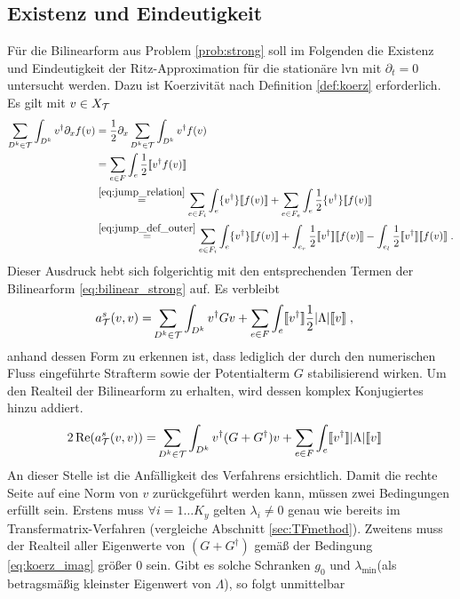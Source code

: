 \subsection{Existenz und Eindeutigkeit}
Für die Bilinearform aus Problem \ref{prob:strong} soll im Folgenden die Existenz und Eindeutigkeit der Ritz-Approximation für die stationäre \ac{lvn} mit $\partial_t=0$ untersucht werden. Dazu ist Koerzivität nach Definition \ref{def:koerz} erforderlich. Es gilt mit $v\in X_{\mathcal{T}}$
\begin{align*}
  \sum_{D^k\in\mathcal{T}}\int_{D^k} v^{\dagger} \partial_x f(v) &=
  \frac{1}{2}\partial_x \sum_{D^k\in\mathcal{T}}\int_{D^k} v^{\dagger} f(v) \\
  &= \sum_{e\in F}\int_e \frac{1}{2}\llbracket v^{\dagger} f(v) \rrbracket \\
  &\stackrel{\eqref{eq:jump_relation}}{=}  \sum_{e\in F_i}\int_e \{ v^{\dagger} \} \llbracket f(v) \rrbracket + \sum_{e\in F_e}\int_{e} \frac{1}{2}\{ v^{\dagger} \} \llbracket f(v) \rrbracket \\
  &\stackrel{\eqref{eq:jump_def_outer}}{=} \sum_{e\in F_i}\int_e \{ v^{\dagger} \} \llbracket f(v) \rrbracket + \int_{e_r}\frac{1}{2} \llbracket v^{\dagger} \rrbracket\llbracket f(v) \rrbracket - \int_{e_l}\frac{1}{2} \llbracket v^{\dagger} \rrbracket\llbracket f(v) \rrbracket \; .
\end{align*}
Dieser Ausdruck hebt sich folgerichtig mit den entsprechenden Termen der Bilinearform \eqref{eq:bilinear_strong} auf. Es verbleibt
\begin{equation*}
  \begin{aligned}
    a_{\mathcal{T}}^s(v, v) = &\sum_{D^k\in\mathcal{T}}\int_{D^k} v^{\dagger} G v
    + \sum_{e\in F}\int_e  \llbracket v^{\dagger} \rrbracket \frac{1}{2}|\Lambda| \llbracket v \rrbracket \; ,
  \end{aligned}
\end{equation*}
anhand dessen Form zu erkennen ist, dass lediglich der durch den numerischen Fluss eingeführte Strafterm sowie der Potentialterm $G$ stabilisierend wirken. Um den Realteil der Bilinearform zu erhalten, wird dessen komplex Konjugiertes hinzu addiert.
\begin{equation}
  \begin{aligned}
    2\operatorname{Re} (a_{\mathcal{T}}^s(v, v)) = &\sum_{D^k\in\mathcal{T}}\int_{D^k} v^{\dagger} (G+G^{\dagger}) v
    + \sum_{e\in F}\int_e  \llbracket v^{\dagger} \rrbracket |\Lambda| \llbracket v \rrbracket
  \end{aligned}
  \label{eq:koerz_result}
\end{equation}
An dieser Stelle ist die Anfälligkeit des Verfahrens ersichtlich. Damit die rechte Seite auf eine Norm von $v$ zurückgeführt werden kann, müssen zwei Bedingungen erfüllt sein. Erstens muss $\forall i=1\dots K_y$ gelten $\lambda_i\neq 0$ genau wie bereits im Transfermatrix-Verfahren (vergleiche Abschnitt \ref{sec:TFmethod}). Zweitens muss der Realteil aller Eigenwerte von $(G+G^{\dagger})$ gemäß der Bedingung \eqref{eq:koerz_imag} größer 0 sein. Gibt es solche Schranken $g_0$ und $\lambda_{\text{min}}$(als betragsmäßig kleinster Eigenwert von $\Lambda$), so folgt unmittelbar
